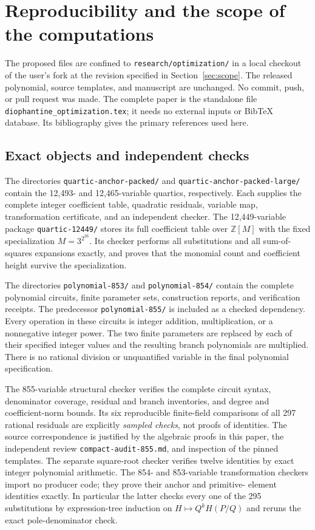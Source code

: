 \documentclass[11pt]{article}
\theoremstyle{definition}
\newcommand{\Z}{\mathbb Z}
\begin{document}
\section{Reproducibility and the scope of the computations}
\label{sec:reproducibility}

The proposed files are confined to \nolinkurl{research/optimization/}
in a local checkout of the user's fork at the revision specified in
Section~\ref{sec:scope}. The released polynomial, source templates, and
manuscript are unchanged. No commit, push, or pull request was made.
The complete paper is the standalone file
\nolinkurl{diophantine_optimization.tex}; it needs no external inputs or
BibTeX database. Its bibliography gives the primary references used here.

\subsection{Exact objects and independent checks}

The directories \nolinkurl{quartic-anchor-packed/} and
\nolinkurl{quartic-anchor-packed-large/} contain the 12,493- and
12,465-variable quartics, respectively. Each supplies the complete
integer coefficient table, quadratic residuals, variable map,
transformation certificate, and an independent checker. The
12,449-variable package \nolinkurl{quartic-12449/} stores its full
coefficient table over $\Z[M]$ with the fixed specialization
$M=3^{2^{26}}$. Its checker performs all substitutions and all
sum-of-squares expansions exactly, and proves that the monomial count
and coefficient height survive the specialization.

The directories \nolinkurl{polynomial-853/} and
\nolinkurl{polynomial-854/} contain the complete polynomial circuits,
finite parameter sets, construction reports, and verification receipts.
The predecessor \nolinkurl{polynomial-855/} is included as a checked
dependency. Every operation in these circuits is integer addition,
multiplication, or a nonnegative integer power. The two finite parameters
are replaced by each of their specified integer values and the resulting
branch polynomials are multiplied. There is no rational division or
unquantified variable in the final polynomial specification.

The 855-variable structural checker verifies the complete circuit
syntax, denominator coverage, residual and branch inventories, and
degree and coefficient-norm bounds. Its six reproducible finite-field
comparisons of all 297 rational residuals are explicitly \emph{sampled
checks}, not proofs of identities. The source correspondence is justified
by the algebraic proofs in this paper, the independent review
\nolinkurl{compact-audit-855.md}, and inspection of the pinned templates.
The separate square-root checker verifies twelve identities by exact
integer polynomial arithmetic. The 854- and 853-variable transformation
checkers import no producer code; they prove their anchor and primitive-
element identities exactly. In particular the latter checks every one
of the 295 substitutions by expression-tree induction on
$H\mapsto Q^kH(P/Q)$ and reruns the exact pole-denominator check.
\end{document}

